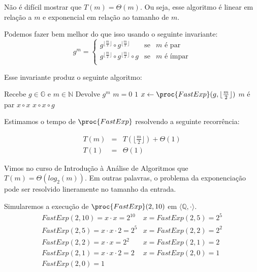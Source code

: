 Não é difícil mostrar que $T(m) = \Theta(m)$.
Ou seja, esse algoritmo é linear em relação a $m$ e exponencial em relação ao tamanho de $m$.

Podemos fazer bem melhor do que isso usando o seguinte invariante:
\begin{displaymath}
  g^m = \left\{
    \begin{array}{lcl}
      g^{\lfloor \frac{m}{2} \rfloor} \circ  g^{\lfloor \frac{m}{2} \rfloor} & \textrm{se} & m \textrm{ é par}\\
      g^{\lfloor \frac{m}{2} \rfloor} \circ  g^{\lfloor \frac{m}{2} \rfloor} \circ g & \textrm{se} & m \textrm{ é ímpar}\\
    \end{array}
    \right.
\end{displaymath}

Esse invariante produz o seguinte algoritmo:
\begin{codebox}
\li \Comment Recebe $g \in \mathbb{G}$ e $m \in \mathbb{N}$
\li \Comment Devolve $g^m$
\li \If $m = 0 $
\li \Then \Return $1$
\End
\li $x \gets \proc{FastExp}(g, \lfloor \frac{m}{2} \rfloor)$
\li \If $m$ é par
\li \Then \Return $x \circ x$
\li \Else \Return $x \circ x \circ g$
\End
\end{codebox}


Estimamos o tempo de $\proc{FastExp}$ resolvendo a seguinte recorrência:

\begin{eqnarray*}
  T(m) & = & T(\lfloor \frac{m}{2} \rfloor) + \Theta(1)\\
  T(1) & = & \Theta(1)
\end{eqnarray*}

Vimos no curso de Introdução à Análise de Algoritmos que $T(m) = \Theta(log_2(m))$.
Em outras palavras, o problema da exponenciação pode ser resolvido lineramente no tamanho da entrada.

\begin{example}
  Simularemos a execução de $\proc{FastExp}(2, 10)$ em $\langle \mathbb{Q}, \cdot \rangle$.
\begin{displaymath}
  \begin{array}{ll}
    FastExp(2, 10) = x \cdot x = 2^{10} & x = FastExp(2, 5) = 2^5 \\
    FastExp(2, 5)  = x \cdot x \cdot 2 = 2^5 & x = FastExp(2, 2) = 2^2\\
    FastExp(2, 2)  = x \cdot x = 2^2 & x = FastExp(2, 1) = 2\\
    FastExp(2, 1)  = x \cdot x \cdot 2 = 2 & x = FastExp(2, 0) = 1\\
    FastExp(2, 0)  = 1 \\
  \end{array}
\end{displaymath}
\end{example}

